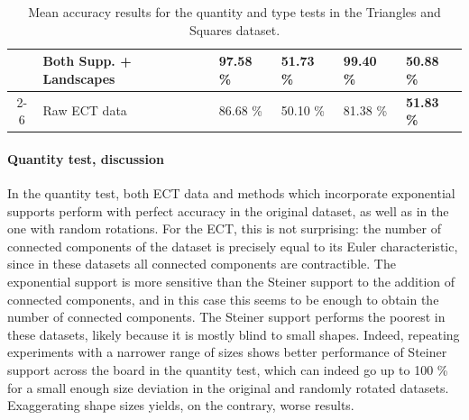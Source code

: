\documentclass[a4paper]{article}
\begin{document}
\begin{table}[]
\begin{tabular}{cl|l|l|l|l|}
 			\multicolumn{1}{|c|}{}                               & Both Supp. + Landscapes    & 97.58 \%          & 51.73 \%                                                   & 99.40 \%                                                & 50.88 \%                                                      \\ \cline{2-6} 
 			\multicolumn{1}{|c|}{}                               & Raw ECT data               & 86.68 \%          & 50.10 \%                                                   & 81.38 \%                                                & \textbf{51.83 \%}                                             \\ \hline
 		\end{tabular}
 	\caption{Mean accuracy results for the quantity and type tests in the Triangles and Squares dataset.}
 	\label{TriSqTable}
 \end{table}
 
 
\paragraph{Quantity test, discussion} In the quantity test, both ECT data and methods which incorporate exponential supports perform with perfect accuracy in the original dataset, as well as in the one with random rotations. For the ECT, this is not surprising: the number of connected components of the dataset is precisely equal to its Euler characteristic, since in these datasets all connected components are contractible. The exponential support is more sensitive than the Steiner support to the addition of connected components, and in this case this seems to be enough to obtain the number of connected components. The Steiner support performs the poorest in these datasets, likely because it is mostly blind to small shapes. Indeed, repeating experiments with a narrower range of sizes shows better performance of Steiner support across the board in the quantity test, which can indeed go up to {100 \%} for a small enough size deviation in the original and randomly rotated datasets. Exaggerating shape sizes yields, on the contrary, worse results. 
\end{document}
